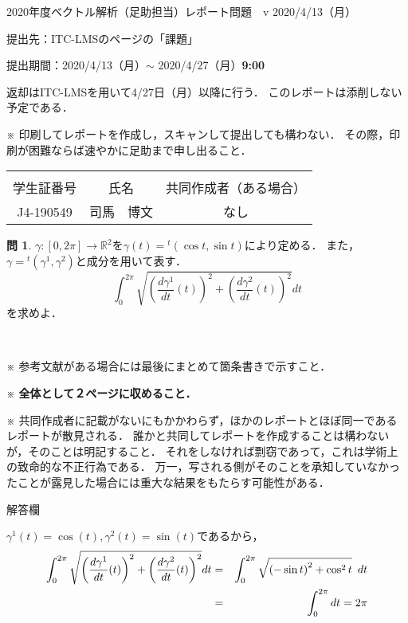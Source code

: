 \documentclass[dvipdfmx,nosetpagesize, uplatex]{jsarticle}
\theoremstyle{definition}
\newtheorem*{question*}{問}
\theoremstyle{StatementsWithStar}
\theoremstyle{StatementsWithStar2}
\theoremstyle{StatementsWithStar3}
\theoremstyle{StatementsWithCCirc}
\theoremstyle{definition}
\begin{document}
\thispagestyle{empty}
\setlength{\parindent}{1zw}
\setlength{\baselineskip}{13pt}
\setcounter{section}{0}
\setcounter{version}{1}
\noindent
2020年度ベクトル解析（足助担当）レポート問題~\thesection~v\theversion%
\hfil2020/4/13（月）\par\noindent
提出先：ITC-LMSのページの「課題」\par\noindent
提出期間：2020/4/13（月）$\sim$ 2020/4/27（月）\textbf{9:00}\par\noindent
返却はITC-LMSを用いて4/27日（月）以降に行う．
このレポートは添削しない予定である．\par\noindent
※ 印刷してレポートを作成し，スキャンして提出しても構わない．
その際，印刷が困難ならば速やかに足助まで申し出ること．
\vskip-18pt\noindent
\begin{table}[h]
\begin{tabular}{|c|c|c|} \hline
& & \\[-13pt]
学生証番号& 氏名 & 共同作成者（ある場合）\\[2pt] \hline
\parbox[c]{9.2zw}{J4-190549\centering} & \parbox[c]{13.0zw}{司馬　博文\centering} & \parbox[c]{25.6zw}{なし\centering}\\[12pt] \hline
\end{tabular}
\end{table}
\vskip-12pt\noindent
% 
\begin{question*}
$\gamma\colon[0,2\pi]\to\mathbb{R}^2$を$\gamma(t)={}^t(\cos t,\sin t)$により定める．
また，$\gamma={}^t(\gamma^1,\gamma^2)$と成分を用いて表す．
\[
\int_0^{2\pi}\sqrt{\left(\dfrac{d\gamma^1}{dt}(t)\right)^2+\left(\dfrac{d\gamma^2}{dt}(t)\right)^2}dt
\]
を求めよ．
\end{question*}
\par
\ \par
\noindent
{\small
※ 参考文献がある場合には最後にまとめて箇条書きで示すこと．\par\noindent
※ \textbf{全体として２ページに収めること．}\par\noindent
※ 共同作成者に記載がないにもかかわらず，ほかのレポートとほぼ同一であるレポートが散見される．
誰かと共同してレポートを作成することは構わないが，そのことは明記すること．
それをしなければ剽窃であって，これは学術上の致命的な不正行為である．
万一，写される側がそのことを承知していなかったことが露見した場合には重大な結果をもたらす可能性がある．
}

\par
%
%
\noindent
解答欄

$\gamma^1(t)=\cos(t),\gamma^2(t)=\sin(t)$であるから，
\begin{eqnarray*}
    \int_0^{2\pi}\sqrt{\left(\dfrac{d\gamma^1}{dt}(t)\right)^2+\left(\dfrac{d\gamma^2}{dt}(t)\right)^2}dt
    &=& \int_0^{2\pi}\sqrt{\left( -\sin t\right)^2+\cos^2t}\hspace{0.5em}dt \\
    &=& \int_0^{2\pi}dt = 2\pi
\end{eqnarray*}
\rightline{$\blacksquare$}
\end{document}
